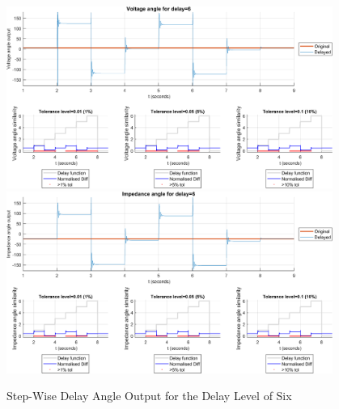 \begin{figure}
    \caption{Step-Wise Delay Angle Output for the Delay Level of Six}
    \includegraphics[width=0.95\textwidth]{PMUsim-figures/DelayOf_6/Step_vAngle.png}    
    \includegraphics[width=0.95\textwidth]{PMUsim-figures/DelayOf_6/Step_iAngle.png}    
    \label{fig:PMUsimStep_Six_Angle}
        \begin{small}
     \end{small}
\end{figure}
